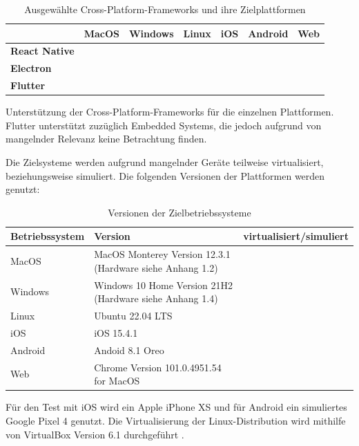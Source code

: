 \documentclass[a4paper]{scrartcl}
\newcommand{\xmark}{\ding{55}}
\begin{document}
\begin{table}[H]
 	\caption{Ausgewählte Cross-Platform-Frameworks und ihre Zielplattformen}
 	\begin{center}
 		\begin{tabular}{| l || c | c | c | c | c | c |}
 			\hline
 			\textbf{} & \textbf{MacOS} & \textbf{Windows} & \textbf{Linux} & \textbf{iOS} & \textbf{Android} & \textbf{Web} \\
 			\hline \hline
			\textbf{React Native} & \xmark & \xmark & \xmark & \Checkmark & \Checkmark & \xmark \\
 			\hline
 			\textbf{Electron} & \Checkmark & \Checkmark & \Checkmark & \xmark & \xmark & \xmark \\
 			\hline
 			\textbf{Flutter} & \Checkmark & \Checkmark & \Checkmark & \Checkmark & \Checkmark & \Checkmark \\
 			\hline
 		\end{tabular}
 	\end{center}
 	\justifying
	\small	
	Unterstützung der Cross-Platform-Frameworks für die einzelnen Plattformen. Flutter unterstützt zuzüglich Embedded Systems, die jedoch aufgrund von mangelnder Relevanz keine Betrachtung finden.
 \end{table}
 
 Die Zielsysteme werden aufgrund mangelnder Geräte teilweise virtualisiert, beziehungsweise simuliert. Die folgenden Versionen der Plattformen werden genutzt:
 
\begin{table}[H]
 	\caption{Versionen der Zielbetriebssysteme}
 	\begin{center}
 		\begin{tabularx}{\linewidth}{| Y | Y | c |}
 			\hline
 			\textbf{Betriebssystem} & \textbf{Version} & \textbf{virtualisiert/simuliert} \\
 			\hline \hline
			MacOS & MacOS Monterey Version 12.3.1 (Hardware siehe Anhang 1.2) & \xmark \\
 			\hline
 			Windows & Windows 10 Home Version 21H2 (Hardware siehe Anhang 1.4) & \xmark \\
 			\hline
 			Linux & Ubuntu 22.04 LTS & \Checkmark \\
 			\hline
 			iOS & iOS 15.4.1 & \xmark \\
 			\hline
 			Android & Andoid 8.1 Oreo & \Checkmark \\
 			\hline
 			Web & Chrome Version 101.0.4951.54 for MacOS & \xmark \\
 			\hline
 		\end{tabularx}
 	\end{center}
 	\justifying
	\small	
	Für den Test mit iOS wird ein Apple iPhone XS und für Android ein simuliertes Google Pixel 4 genutzt. Die Virtualisierung der Linux-Distribution wird mithilfe von VirtualBox Version 6.1 durchgeführt \autocite{VirtualBox}.
\end{table}
 
\end{document}
